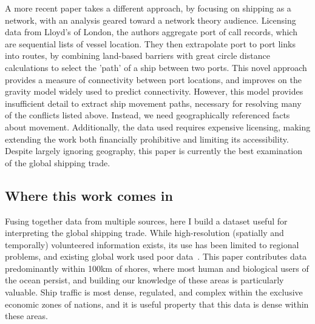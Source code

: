 \documentclass[12pt,letterpaper]{article}
\begin{document}
A more recent paper \citep{Kaluza2010} takes a different approach, by focusing on shipping as a network, with an analysis geared toward a network theory audience. Licensing data from Lloyd's of London, %
 the authors aggregate port of call records, which are sequential lists of vessel location. They then extrapolate port to port links into routes, by combining land-based barriers with great circle distance calculations to select the 'path' of a ship between two ports. This novel approach provides a measure of connectivity between port locations, and improves on the gravity model widely used to predict connectivity. %
However, this model provides insufficient detail to extract ship movement paths, necessary for resolving many of the conflicts listed above. Instead, we need geographically referenced facts about movement. Additionally, the data used requires expensive licensing, making extending the work both financially prohibitive and limiting its accessibility. Despite largely ignoring geography, this paper is currently the best examination of the global shipping trade.


\subsection{Where this work comes in}

Fusing together data from multiple sources, here I build a dataset useful for interpreting the global shipping trade. While high-resolution (spatially and temporally) volunteered information exists, its use has been limited to regional problems, and existing global work used poor data~\citep{Corbett2007, Halpern2008}. This paper contributes data predominantly within 100km of shores, where most human and biological users of the ocean persist, and building our knowledge of these areas is particularly valuable. Ship traffic is most dense, regulated, and complex within the exclusive economic zones of nations, and it is useful property that this data is dense within these areas.
\end{document}
